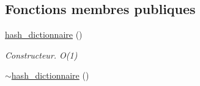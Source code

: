 \subsection*{Fonctions membres publiques}
\begin{DoxyCompactItemize}
\item 
\hypertarget{classhash__dictionnaire_a381e1d57c7bd7d74aaf16ca6c44056d7}{\hyperlink{classhash__dictionnaire_a381e1d57c7bd7d74aaf16ca6c44056d7}{hash\-\_\-dictionnaire} ()}\label{classhash__dictionnaire_a381e1d57c7bd7d74aaf16ca6c44056d7}

\begin{DoxyCompactList}\small\item\em Constructeur. O(1) \end{DoxyCompactList}\item 
\hypertarget{classhash__dictionnaire_a17ea93b8a231a3f54d49197c5cfca700}{\hyperlink{classhash__dictionnaire_a17ea93b8a231a3f54d49197c5cfca700}{$\sim$hash\-\_\-dictionnaire} ()}\label{classhash__dictionnaire_a17ea93b8a231a3f54d49197c5cfca700}


\end{DoxyCompactItemize}
